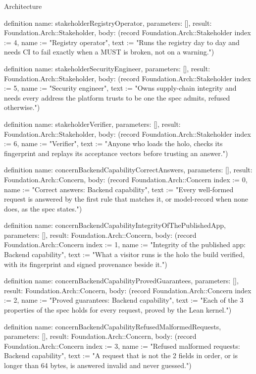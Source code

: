 \begin{lexlean}{Architecture}
\begin{semanticmodule}
definition{
  name: stakeholderRegistryOperator,
  parameters: [],
  result: Foundation.Arch::Stakeholder,
  body: (record Foundation.Arch::Stakeholder {index := 4, name := "Registry operator", text := "Runs the registry day to day and needs CI to fail exactly when a MUST is broken, not on a warning."})
}

definition{
  name: stakeholderSecurityEngineer,
  parameters: [],
  result: Foundation.Arch::Stakeholder,
  body: (record Foundation.Arch::Stakeholder {index := 5, name := "Security engineer", text := "Owns supply-chain integrity and needs every address the platform trusts to be one the spec admits, refused otherwise."})
}

definition{
  name: stakeholderVerifier,
  parameters: [],
  result: Foundation.Arch::Stakeholder,
  body: (record Foundation.Arch::Stakeholder {index := 6, name := "Verifier", text := "Anyone who loads the holo, checks its fingerprint and replays its acceptance vectors before trusting an answer."})
}

definition{
  name: concernBackendCapabilityCorrectAnswers,
  parameters: [],
  result: Foundation.Arch::Concern,
  body: (record Foundation.Arch::Concern {index := 0, name := "Correct answers: Backend capability", text := "Every well-formed request is answered by the first rule that matches it, or model-record when none does, as the spec states."})
}

definition{
  name: concernBackendCapabilityIntegrityOfThePublishedApp,
  parameters: [],
  result: Foundation.Arch::Concern,
  body: (record Foundation.Arch::Concern {index := 1, name := "Integrity of the published app: Backend capability", text := "What a visitor runs is the holo the build verified, with its fingerprint and signed provenance beside it."})
}

definition{
  name: concernBackendCapabilityProvedGuarantees,
  parameters: [],
  result: Foundation.Arch::Concern,
  body: (record Foundation.Arch::Concern {index := 2, name := "Proved guarantees: Backend capability", text := "Each of the 3 properties of the spec holds for every request, proved by the Lean kernel."})
}

definition{
  name: concernBackendCapabilityRefusedMalformedRequests,
  parameters: [],
  result: Foundation.Arch::Concern,
  body: (record Foundation.Arch::Concern {index := 3, name := "Refused malformed requests: Backend capability", text := "A request that is not the 2 fields in order, or is longer than 64 bytes, is answered invalid and never guessed."})
}


\end{semanticmodule}
\end{lexlean}
